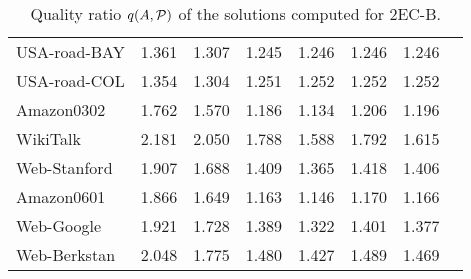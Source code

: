 \documentclass[11pt]{article}
\begin{document}
\begin{table}[!ht]
\begin{adjustbox}{width=\textwidth,totalheight=\textheight,keepaspectratio}
\begin{small}
\begin{tabular}{l|ccccccc}
USA-road-BAY                        & 1.361                              & 1.307                                         & 1.245                                 & 1.246                                        & 1.246                                     & 1.246      \\
USA-road-COL                        & 1.354                              & 1.304                                         & 1.251                                 & 1.252                                        & 1.252                                     & 1.252      \\
Amazon0302                          & 1.762                              & 1.570                                         & 1.186                                 & 1.134                                        & 1.206                                     & 1.196      \\
WikiTalk                            & 2.181                              & 2.050                                         & 1.788                                 & 1.588                                        & 1.792                                     & 1.615      \\
Web-Stanford                        & 1.907                              & 1.688                                         & 1.409                                 & 1.365                                        & 1.418                                     & 1.406      \\
Amazon0601                          & 1.866                              & 1.649                                         & 1.163                                 & 1.146                                        & 1.170                                     & 1.166      \\
Web-Google                          & 1.921                              & 1.728                                         & 1.389                                 & 1.322                                        & 1.401                                     & 1.377          \\
Web-Berkstan                        & 2.048                              & 1.775                                         & 1.480                                 & 1.427                                        & 1.489                                     & 1.469         \\
\hline
\end{tabular}  \end{small}
\end{adjustbox}
\caption{Quality ratio $q(A,{\cal P})$ of the solutions computed for \textsf{2EC-B}.}\label{tab:2ECB}



\end{table}
\end{document}
